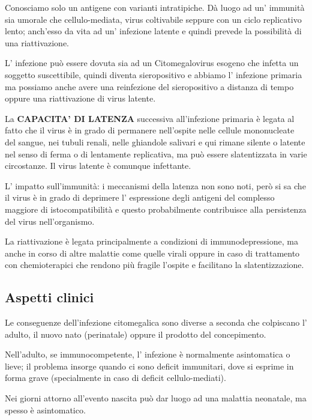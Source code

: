   Conosciamo solo un antigene con varianti intratipiche. Dà luogo ad un'
  immunità sia umorale che cellulo-mediata, virus coltivabile seppure
  con un ciclo replicativo lento; anch'esso da vita ad un' infezione
  latente e quindi prevede la possibilità di una riattivazione.

  L' infezione può essere dovuta sia ad un Citomegalovirus esogeno che
  infetta un soggetto suscettibile, quindi diventa sieropositivo e
  abbiamo l' infezione primaria ma possiamo anche avere una reinfezione
  del sieropositivo a distanza di tempo oppure una riattivazione di
  virus latente.

  La \textbf{CAPACITA' DI LATENZA} successiva all'infezione primaria è
  legata al fatto che il virus è in grado di permanere nell'ospite nelle
  cellule mononucleate del sangue, nei tubuli renali, nelle ghiandole
  salivari e qui rimane silente o latente nel senso di ferma o di
  lentamente replicativa, ma può essere slatentizzata in varie
  circostanze. Il virus latente è comunque infettante.

  L' impatto sull'immunità: i meccanismi della latenza non sono noti,
  però si sa che il virus è in grado di deprimere l' espressione degli
  antigeni del complesso maggiore di istocompatibilità e questo
  probabilmente contribuisce alla persistenza del virus nell'organismo.

  La riattivazione è legata principalmente a condizioni di
  immunodepressione, ma anche in corso di altre malattie come quelle
  virali oppure in caso di trattamento con chemioterapici che rendono
  più fragile l'ospite e facilitano la slatentizzazione.

\subsection{Aspetti clinici}

  Le conseguenze dell'infezione citomegalica sono diverse a seconda che
  colpiscano l' adulto, il nuovo nato (perinatale) oppure il prodotto
  del concepimento.

  Nell'adulto, se immunocompetente, l' infezione è normalmente
  asintomatica o lieve; il problema insorge quando ci sono deficit
  immunitari, dove si esprime in forma grave (specialmente in caso di
  deficit cellulo-mediati).

  Nei giorni attorno all'evento nascita può dar luogo ad una malattia
  neonatale, ma spesso è asintomatico.


